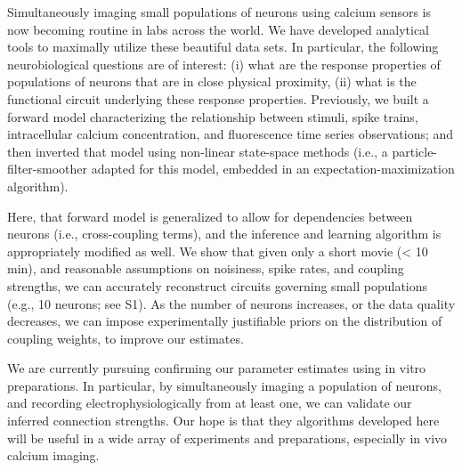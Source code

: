 Simultaneously imaging small populations of neurons using calcium sensors is now becoming routine in labs across the world.  We have developed analytical tools to maximally utilize these beautiful data sets.  In particular, the following neurobiological questions are of interest: (i) what are the response properties of populations of neurons that are in close physical proximity, (ii) what is the functional circuit underlying these response properties.  Previously, we built a forward model characterizing the relationship between stimuli, spike trains, intracellular calcium concentration, and fluorescence time series observations; and then inverted that model using non-linear state-space methods (i.e., a particle-filter-smoother adapted for this model, embedded in an expectation-maximization algorithm).  

Here, that forward model is generalized to allow for dependencies between neurons (i.e., cross-coupling terms), and the inference and learning algorithm is appropriately modified as well.  We show that given only a short movie (< 10 min), and reasonable assumptions on noisiness, spike rates, and coupling strengths, we can accurately reconstruct circuits governing small populations (e.g., 10 neurons; see S1).  As the number of neurons increases, or the data quality decreases, we can impose experimentally justifiable priors on the distribution of coupling weights, to improve our estimates.  

We are currently pursuing confirming our parameter estimates using in vitro preparations.  In particular, by simultaneously imaging a population of neurons, and recording electrophysiologically from at least one, we can validate our inferred connection strengths.  Our hope is that they algorithms developed here will be useful in a wide array of experiments and preparations, especially in vivo calcium imaging.